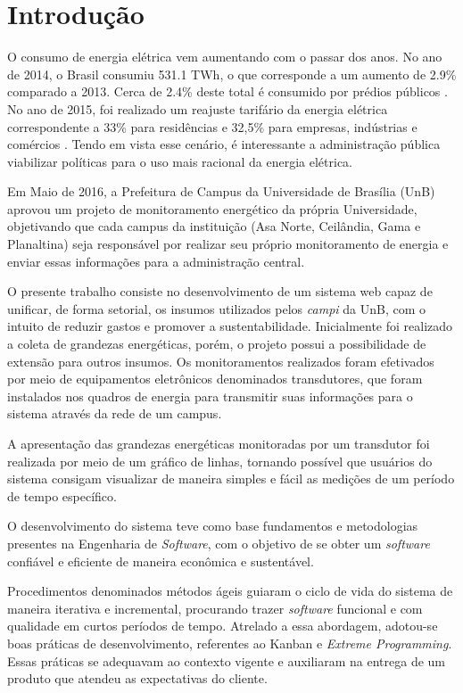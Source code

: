 \chapter{Introdução}
O consumo de energia elétrica vem aumentando com o passar dos anos. No ano de 2014, o Brasil consumiu 531.1 TWh, o que corresponde a um aumento de 2.9\% comparado a 2013. Cerca de 2.4\% deste total é consumido por prédios públicos \cite{balanco_energetico}. No ano de 2015, foi realizado um reajuste tarifário da energia elétrica correspondente a 33\% para residências e 32,5\% para empresas, indústrias e comércios \cite{aumento_energia}. Tendo em vista esse cenário, é interessante a administração pública viabilizar políticas para o uso mais racional da energia elétrica.

Em Maio de 2016, a Prefeitura de Campus da Universidade de Brasília (UnB) aprovou um projeto de monitoramento energético da própria Universidade, objetivando que cada campus da instituição (Asa Norte, Ceilândia, Gama e Planaltina) seja responsável por realizar seu próprio monitoramento de energia e enviar essas informações para a administração central.

O presente trabalho consiste no desenvolvimento de um sistema web capaz de unificar, de forma setorial, os insumos utilizados pelos \textit{campi} da UnB, com o intuito de reduzir gastos e promover a sustentabilidade. Inicialmente foi realizado a coleta de grandezas energéticas, porém, o projeto possui a possibilidade de extensão para outros insumos. Os monitoramentos realizados foram efetivados por meio de equipamentos eletrônicos denominados transdutores, que foram instalados nos quadros de energia para transmitir suas informações para o sistema através da rede de um campus.

A apresentação das grandezas energéticas monitoradas por um transdutor foi realizada por meio de um gráfico de linhas, tornando possível que usuários do sistema consigam visualizar de maneira simples e fácil as medições de um período de tempo específico.

O desenvolvimento do sistema teve como base fundamentos e metodologias presentes na Engenharia de \textit{Software}, com o objetivo de se obter um \textit{software} confiável e eficiente de maneira econômica e sustentável.

Procedimentos denominados métodos ágeis guiaram o ciclo de vida do sistema de maneira iterativa e incremental, procurando trazer \textit{software} funcional e com qualidade em curtos períodos de tempo. Atrelado a essa abordagem, adotou-se boas práticas de desenvolvimento, referentes ao Kanban e \textit{Extreme Programming}. Essas práticas se adequavam ao contexto vigente e auxiliaram na entrega de um produto que atendeu as expectativas do cliente.

